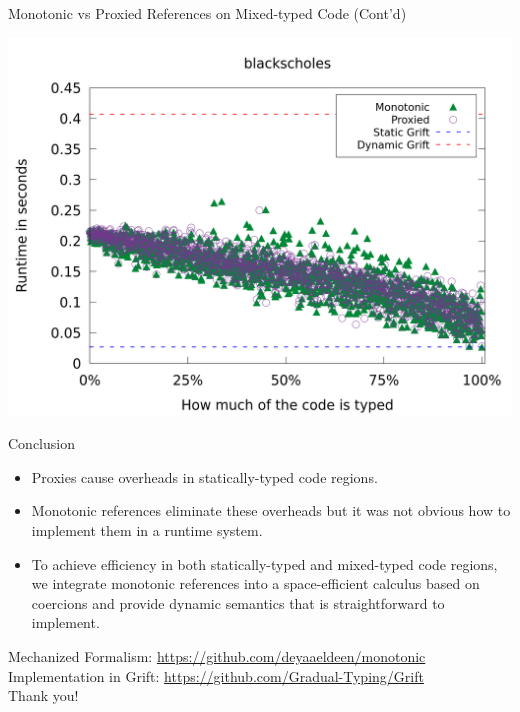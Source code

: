 \documentclass[12pt,dvipsnames]{beamer}
\begin{document}

\begin{frame}{Monotonic vs Proxied References on Mixed-typed Code (Cont'd)}
  \begin{center}
    \includegraphics[scale=0.25]{plots/fine/Specialized_Coercions_Lazy/runtimes/blackscholes.png}
  \end{center}
\end{frame}

\begin{frame}{Conclusion}
  \begin{itemize}
  \item Proxies cause overheads in statically-typed code regions.
  \item Monotonic references eliminate these overheads but it was not
    obvious how to implement them in a runtime system.
  \item To achieve efficiency in both statically-typed and mixed-typed
    code regions, we integrate monotonic references into a
    space-efficient calculus based on coercions and provide dynamic
    semantics that is straightforward to implement.
  \end{itemize}
  \vspace{1cm}
  \centering
  Mechanized Formalism: \url{https://github.com/deyaaeldeen/monotonic}
  Implementation in Grift: \url{https://github.com/Gradual-Typing/Grift}
  \\
  \vspace{1cm}
  \centering
  \Huge Thank you!
\end{frame}
\end{document}
